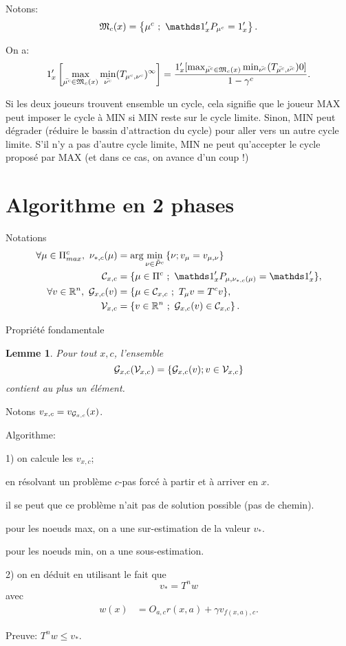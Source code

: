 \documentclass{article}
\newtheorem{lemma}{Lemme}
\def\1{{\mathds 1}}
\def\G{{\cal G}}
\def\C{{\cal C}}
\def\V{{\cal V}}
\def\R{\mathbb R}
\def\N{\mathfrak N}
\def\M{\mathfrak M}
\begin{document}
Notons:
\begin{align}
\M_c(x) & = \left\{ \muc ~;~ \1_x' P_{\muc} = 1'_x \right\}. \\
\end{align}

On a:
\begin{align}
1_x' \left[ \max_{\bar\muc \in \M_c(x)} \min_{\bar\nuc} (T_{\muc,\nuc})^\infty \right] = \frac{ 1_x' [ \max_{\bar\muc \in \M_c(x)} \min_{\bar\nuc} (T_{\bar\muc,\bar\nuc}) 0 ] }{1-\gamma^c}.
\end{align}

 

Si les deux joueurs trouvent ensemble un cycle, cela signifie que le joueur MAX peut imposer le cycle à MIN si MIN reste sur le cycle limite.
Sinon, MIN peut dégrader (réduire le bassin d'attraction du cycle) pour aller vers un autre cycle limite.
S'il n'y a pas d'autre cycle limite, MIN ne peut qu'accepter le cycle proposé par MAX (et dans ce cas, on avance d'un coup !)


\section{Algorithme en 2 phases}

Notations
\begin{align}
 \forall \mu \in \Pi_{max}^c,~ \nu_{*,c}(\mu) &= \arg\min_{\nu \in \tilde P^c} \left\{\nu ; v_\mu = v_{\mu,\nu} \right\}\\
  \C_{x,c} & = \{ \mu \in \Pi^c ~;~ \1_x' P_{\mu,\nu_{*,c}(\mu)} = \1_x' \},\\
 \forall v \in \R^n,~ \G_{x,c}(v) & = \{ \mu \in \C_{x,c} ~;~ T_\mu v = T^c v\},\\
  \V_{x,c} & = \left\{ v \in \R^n ~;~ \G_{x,c}(v) \in \C_{x,c} \right\}.
\end{align}

Propriété fondamentale
\begin{lemma}
  Pour tout $x,c$, l'ensemble
  $$
  \G_{x,c}(\V_{x,c})=\left\{ \G_{x,c}(v); v \in \V_{x,c} \right\}
$$
  contient au plus un élément.
\end{lemma}
Notons $v_{x,c}=v_{\G_{x,c}}(x)$.

Algorithme:

1) on calcule les $v_{x,c}$;

en résolvant un problème $c$-pas forcé à partir et à arriver en $x$.

il se peut que ce problème n'ait pas de solution possible (pas de chemin).


pour les noeuds max, on a une sur-estimation de la valeur $v_*$.

pour les noeuds min, on a une sous-estimation.


2) on en déduit en utilisant le fait que
$$
v_* = T^n w
$$
avec
\begin{align}
  w(x) & = O_{a,c} r(x,a) + \gamma v_{f(x,a),c}.
\end{align}

Preuve:  $T^n w \le v_*$. 


 
\end{document}
